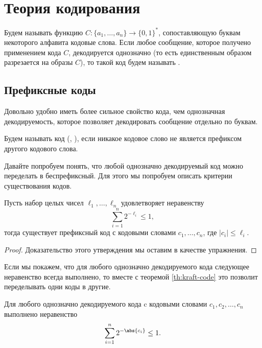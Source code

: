 \section{Теория кодирования}

\begin{definition}
    Будем называть  функцию $C\colon \{a_1, \dots , a_n\} \to \{0, 1\}^{*}$,
    сопоставляющую буквам некоторого алфавита кодовые слова. Если любое сообщение, которое получено
    применением кода $C$, декодируется однозначно (то есть единственным образом разрезается на образы
    $C$), то такой код будем называть .
\end{definition}

\subsection{Префиксные коды}

Довольно удобно иметь более сильное свойство кода, чем однозначная декодируемость, которое позволяет
декодировать сообщение отдельно по буквам.

\begin{definition}
    Будем называть код  (, ), если
    никакое кодовое слово не является префиксом другого кодового слова.
\end{definition}

Давайте попробуем понять, что любой однозначно декодируемый код можно переделать в беспрефиксный. Для
этого мы попробуем описать критерии существования кодов.

\begin{theorem}
    \label{th:kraft-code}
    Пусть набор целых чисел $\ell_1, \dots, \ell_n$ удовлетворяет неравенству
    $$
        \sum\limits_{i = 1}^{n} 2^{-\ell_i} \le 1,
    $$
    тогда существует префиксный код с кодовыми словами $c_1, \dots , c_n$, где $|c_i| \le \ell_i$.
\end{theorem}

\begin{proof}
    Доказательство этого утверждения мы оставим в качестве упражнения.
\end{proof} 

Если мы покажем, что для любого однозначно декодируемого кода следующее неравенство всегда выполнено, то
вместе с теоремой \ref{th:kraft-code} это позволит переделывать одни коды в другие.

\begin{proposition}
    Для любого однозначно декодируемого кода c кодовыми словами $c_1, c_2, \dots, c_n$ выполнено
    неравенство
    $$
        \sum\limits_{i = 1}^n 2^{-\abs{c_i}}\le 1.
    $$ 
\end{proposition}

